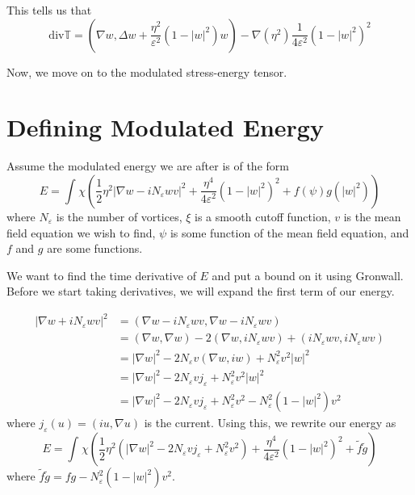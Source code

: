 \documentclass[a4paper]{article}
\renewcommand{\div}{\mathrm{div}}
\begin{document}
This tells us that
\begin{equation} \label{eqn:div_stress_energy}
  \div \mathbb{T} = ( \nabla w, \Delta w + \frac{\eta^2}{\varepsilon^2} (1 - |w|^2)w) - \nabla(\eta^2) \frac{1}{4 \varepsilon^2} (1 - |w|^2)^2
\end{equation}

Now, we move on to the modulated stress-energy tensor.

\section{Defining Modulated Energy}
Assume the modulated energy we are after is of the form
\begin{equation} \label{eqn:energy_form_primitive}
  E = \int_{}^{} \chi \left( \frac{1}{2} \eta^2 |\nabla w - i N_\varepsilon w v|^2 + \frac{\eta^4}{4 \varepsilon^2} ( 1 - |w|^2)^2 + f(\psi) g(|w|^2) \right)
\end{equation}
where $N_\varepsilon$ is the number of vortices, $\xi$ is a smooth cutoff function, $v$ is the mean field equation we wish to find, $\psi$ is some
function of the mean field equation, and $f$ and $g$ are some functions.

We want to find the time derivative of $E$ and put a bound on it using Gronwall.
Before we start taking derivatives, we will expand the first term of our energy.

\begin{align*}
  |\nabla w + iN_\varepsilon w v|^2 &= ( \nabla w - iN_\varepsilon w v , \nabla w - iN_\varepsilon w v ) \\
  &= (\nabla w, \nabla w ) - 2 ( \nabla w, iN_\varepsilon w v ) + ( i N_\varepsilon w v, i N_\varepsilon w v ) \\
  &= | \nabla w |^2 - 2 N_\varepsilon v ( \nabla w, iw ) + N_\varepsilon^2 v^2 |w|^2 \\
  &= | \nabla w |^2 - 2 N_\varepsilon v j_\varepsilon + N_\varepsilon^2 v^2 |w|^2 \\
  &= | \nabla w |^2 - 2 N_\varepsilon v j_\varepsilon + N_\varepsilon^2 v^2 - N_\varepsilon^2 ( 1 - |w|^2 )v^2
\end{align*}
where $j_\varepsilon(u) = (iu, \nabla u)$ is the current.
Using this, we rewrite our energy as
\begin{equation} \label{eqn:energy_form}
  E = \int_{}^{} \chi \left( \frac{1}{2} \eta^2 \left( | \nabla w |^2 - 2 N_\varepsilon v j_\varepsilon + N_\varepsilon^2 v^2
  \right) + \frac{\eta^4}{4 \varepsilon^2} ( 1 - |w|^2)^2 + \tilde{f} \tilde{g} \right)
\end{equation}
where $\tilde{f} \tilde{g} = fg - N_\varepsilon^2 (1 - |w|^2) v^2$.
\end{document}
